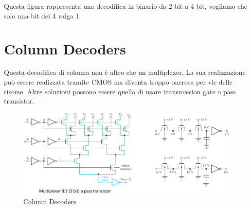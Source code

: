 Questa figura rappresenta una decodifica in binario da 2 bit a 4 bit, vogliamo che solo una bit dei 4 valga 1.


\newpage
\section{Column Decoders}

Questa decodifica di colonna non è altro che un multiplexer. La sua realizzazione può essere realizzata tramite CMOS ma diventa troppo onerosa per vie delle risorse. Altre soluzioni possono essere quella di usare transmission gate o pass transistor.

\begin{figure}[htbp]
    \centering
    \includegraphics[width=1\linewidth]{img/colum_dec.png}
    \caption{Column Decoders}
\end{figure}

